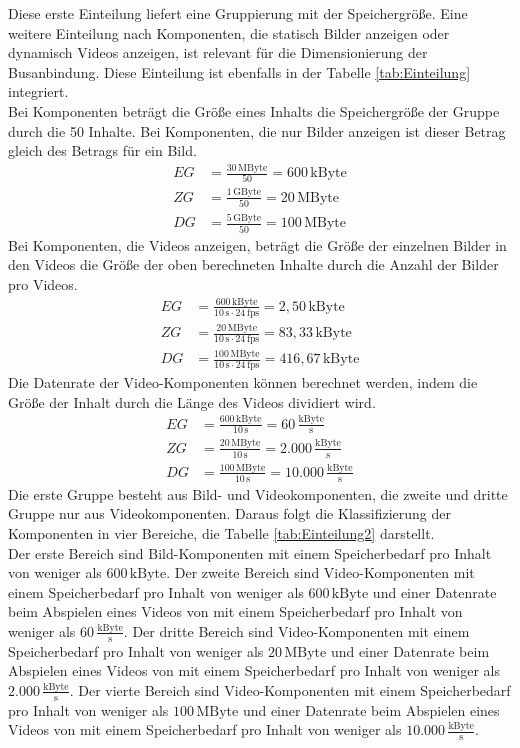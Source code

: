 Diese erste Einteilung liefert eine Gruppierung mit der Speichergröße. Eine weitere Einteilung nach Komponenten, die statisch Bilder anzeigen oder dynamisch Videos anzeigen, ist relevant für die Dimensionierung der Busanbindung. Diese Einteilung ist ebenfalls in der Tabelle \ref{tab:Einteilung} integriert. \\
Bei Komponenten beträgt die Größe eines Inhalts die Speichergröße der Gruppe durch die 50 Inhalte. Bei Komponenten, die nur Bilder anzeigen ist dieser Betrag gleich des Betrags für ein Bild.
\begin{align}
	EG &= \frac{30\,\mathrm{MByte}}{50} = 600\,\mathrm{kByte} \\
	ZG &= \frac{1\,\mathrm{GByte}}{50} =  20\,\mathrm{MByte} \\
	DG &= \frac{5\,\mathrm{GByte}}{50} = 100\,\mathrm{MByte}
\end{align}
Bei Komponenten, die Videos anzeigen, beträgt die Größe der einzelnen Bilder in den Videos die Größe der oben berechneten Inhalte durch die Anzahl der Bilder pro Videos.
\begin{align}
	EG &= \frac{600\,\mathrm{kByte}}{10\,\mathrm{s} \cdot 24\,\mathrm{fps}} = 2,50\,\mathrm{kByte} \\
	ZG &= \frac{20\,\mathrm{MByte}}{10\,\mathrm{s} \cdot 24\,\mathrm{fps}} = 83,33\,\mathrm{kByte} \\
	DG &= \frac{100\,\mathrm{MByte}}{10\,\mathrm{s} \cdot 24\,\mathrm{fps}} = 416,67\,\mathrm{kByte}
\end{align}
Die Datenrate der Video-Komponenten können berechnet werden, indem die Größe der Inhalt durch die Länge des Videos dividiert wird.
\begin{align}
	EG &= \frac{600\,\mathrm{kByte}}{10\,\mathrm{s}} = 60\,\frac{\mathrm{kByte}}{\mathrm{s}}\\
	ZG &= \frac{20\,\mathrm{MByte}}{10\,\mathrm{s}} = 2.000\,\frac{\mathrm{kByte}}{\mathrm{s}} \\
	DG &= \frac{100\,\mathrm{MByte}}{10\,\mathrm{s}} = 10.000\,\frac{\mathrm{kByte}}{\mathrm{s}}
\end{align}
Die erste Gruppe besteht aus Bild- und Videokomponenten, die zweite und dritte Gruppe nur aus Videokomponenten. Daraus folgt die Klassifizierung der Komponenten in vier Bereiche, die Tabelle \ref{tab:Einteilung2} darstellt. \\
Der erste Bereich sind Bild-Komponenten mit einem Speicherbedarf pro Inhalt von weniger als $ 600\,\mathrm{kByte} $. Der zweite Bereich sind Video-Komponenten mit einem Speicherbedarf pro Inhalt von weniger als $ 600\,\mathrm{kByte} $ und einer Datenrate beim Abspielen eines Videos von mit einem Speicherbedarf pro Inhalt von weniger als $ 60\,\frac{\mathrm{kByte}}{\mathrm{s}} $. Der dritte Bereich sind Video-Komponenten mit einem Speicherbedarf pro Inhalt von weniger als $ 20\,\mathrm{MByte} $ und einer Datenrate beim Abspielen eines Videos von mit einem Speicherbedarf pro Inhalt von weniger als $ 2.000\,\frac{\mathrm{kByte}}{\mathrm{s}} $. Der vierte Bereich sind Video-Komponenten mit einem Speicherbedarf pro Inhalt von weniger als $ 100\,\mathrm{MByte} $ und einer Datenrate beim Abspielen eines Videos von mit einem Speicherbedarf pro Inhalt von weniger als $ 10.000\,\frac{\mathrm{kByte}}{\mathrm{s}} $. \\
